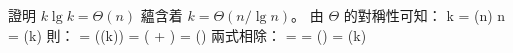 \startEXERCISE
證明 $k\lg k = \Theta(n)$ 蘊含着 $k = \Theta(n/\lg n)$。
\stopEXERCISE
\startANSWER
由 $\Theta$ 的對稱性可知：
\startformula
k = \Theta(n) \Rightarrow n = \Theta(k)
\stopformula
則：
\startsplitformula\startmathalignment
\NC {}
    \NC = \Theta(\lg(k)) \NR
\NC \NC = \Theta( + \lg{}) \NR
\NC \NC = \Theta() \NR
\stopmathalignment\stopsplitformula
兩式相除：
\startsplitformula\startmathalignment
\NC \NC {} \NR
\NC = \NC {} \NR
\NC = \NC \Theta() \NR
\NC = \NC \Theta(k) \NR
\stopmathalignment\stopsplitformula
\stopANSWER

\stopsection
